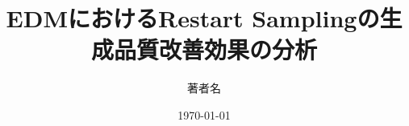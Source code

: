 \documentclass[uplatex,dvipdfmx,a4paper,11pt]{jsreport}
\begin{document}
\title{EDMにおけるRestart Samplingの生成品質改善効果の分析}
\author{著者名}
\date{\today}
\maketitle

\tableofcontents





\end{document}

